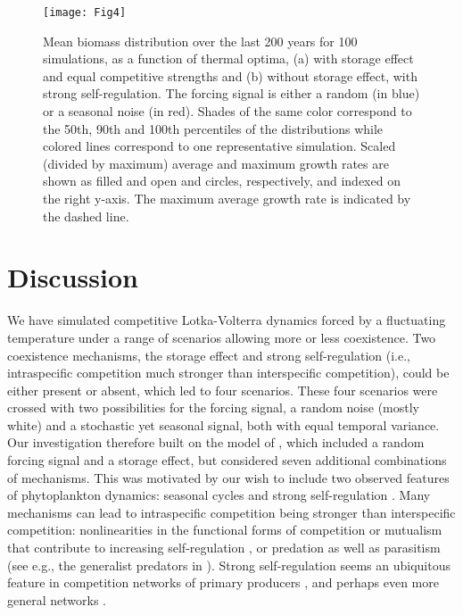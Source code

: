 \documentclass[a4paper,12pt]{article}
\begin{document}
\begin{figure}[!ht]
\begin{centering}
\texttt{[image: Fig4]}
\par\end{centering}
\caption{Mean biomass distribution over the last 200 years for 100 simulations,
as a function of thermal optima, (a) with storage effect and equal
competitive strengths and (b) without storage effect, with strong
self-regulation. The forcing signal is either a random (in blue) or
a seasonal noise (in red). Shades of the same color correspond to
the 50th, 90th and 100th percentiles of the distributions while colored
lines correspond to one representative simulation. Scaled (divided
by maximum) average and maximum growth rates are shown as filled and
open and circles, respectively, and indexed on the right y-axis. The
maximum average growth rate is indicated by the dashed line.\label{fig:Unstable_cases}}
\end{figure}


\section{Discussion}

We have simulated competitive Lotka-Volterra dynamics forced by a
fluctuating temperature under a range of scenarios allowing more or
less coexistence. Two coexistence mechanisms, the storage effect and
strong self-regulation (i.e., intraspecific competition much stronger
than interspecific competition), could be either present or absent,
which led to four scenarios. These four scenarios were crossed with
two possibilities for the forcing signal, a random noise (mostly white)
and a stochastic yet seasonal signal, both with equal temporal variance.
Our investigation therefore built on the model of \citet{scranton_coexistence_2016},
which included a random forcing signal and a storage effect, but considered
seven additional combinations of mechanisms. This was motivated by
our wish to include two observed features of phytoplankton dynamics:
seasonal cycles \citep{winder_annual_2010,boyce_environmental_2017}
and strong self-regulation \citep{chesson_mechanisms_2000,adler_coexistence_2010,barraquand2018coastal}.
Many mechanisms can lead to intraspecific competition being stronger
than interspecific competition: nonlinearities in the functional forms
of competition or mutualism that contribute to increasing self-regulation
\citep{kawatsu2018density}, or predation as well as parasitism (see
e.g., the generalist predators in \citealp{haydon1994pivotal}). Strong
self-regulation seems an ubiquitous feature in competition networks
of primary producers \citep{adler_competition_2018}, and perhaps
even more general networks \citep{barabas_self-regulation_2017}.
\end{document}
